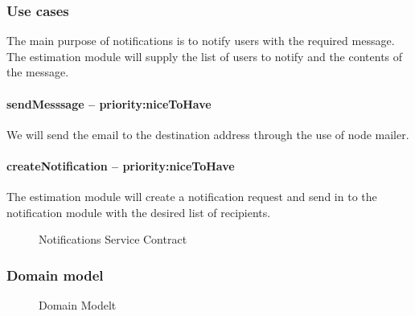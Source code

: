 \subsubsection{Use cases}
The main purpose of notifications is to notify users with the required message. The estimation module will supply the list of users to notify and the contents of the message.
\paragraph{sendMesssage -- priority:niceToHave}
We will send the email to the destination address through the use of node mailer. 
\paragraph{createNotification -- priority:niceToHave}
The estimation module will create a notification request and send in to the notification module with the desired list of recipients.
	\begin{figure}[H]
	    	\centering
	    	\caption{Notifications Service Contract}
	    	\label{fig:Notification_Service Contract}
   	\end{figure}
\subsubsection{Domain model}
	\begin{figure}[H]
	    	\centering
	    	\caption{Domain Modelt}
	    	\label{fig:Domain Model}
   	\end{figure}
